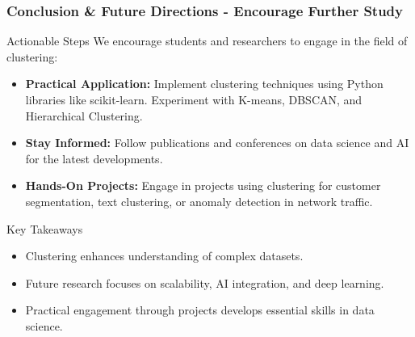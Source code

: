 \documentclass[aspectratio=169]{beamer}
\begin{document}
\begin{frame}[fragile]
    \frametitle{Conclusion \& Future Directions - Encourage Further Study}
    \begin{block}{Actionable Steps}
        We encourage students and researchers to engage in the field of clustering:
    \end{block}
    \begin{itemize}
        \item \textbf{Practical Application:} Implement clustering techniques using Python libraries like scikit-learn. Experiment with K-means, DBSCAN, and Hierarchical Clustering.
        \item \textbf{Stay Informed:} Follow publications and conferences on data science and AI for the latest developments.
        \item \textbf{Hands-On Projects:} Engage in projects using clustering for customer segmentation, text clustering, or anomaly detection in network traffic.
    \end{itemize}
    \begin{block}{Key Takeaways}
        \begin{itemize}
            \item Clustering enhances understanding of complex datasets.
            \item Future research focuses on scalability, AI integration, and deep learning.
            \item Practical engagement through projects develops essential skills in data science.
        \end{itemize}
    \end{block}
\end{frame}
\end{document}
